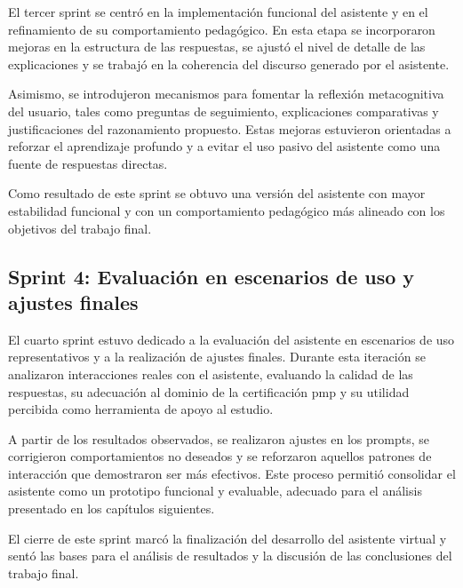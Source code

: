 El tercer sprint se centró en la implementación funcional del asistente y en el refinamiento de su comportamiento pedagógico. En esta etapa se incorporaron mejoras en la estructura de las respuestas, se ajustó el nivel de detalle de las explicaciones y se trabajó en la coherencia del discurso generado por el asistente.

Asimismo, se introdujeron mecanismos para fomentar la reflexión metacognitiva del usuario, tales como preguntas de seguimiento, explicaciones comparativas y justificaciones del razonamiento propuesto. Estas mejoras estuvieron orientadas a reforzar el aprendizaje profundo y a evitar el uso pasivo del asistente como una fuente de respuestas directas.

Como resultado de este sprint se obtuvo una versión del asistente con mayor estabilidad funcional y con un comportamiento pedagógico más alineado con los objetivos del trabajo final.

\subsection{Sprint 4: Evaluación en escenarios de uso y ajustes finales}

El cuarto sprint estuvo dedicado a la evaluación del asistente en escenarios de uso representativos y a la realización de ajustes finales. Durante esta iteración se analizaron interacciones reales con el asistente, evaluando la calidad de las respuestas, su adecuación al dominio de la certificación \gls{pmp} y su utilidad percibida como herramienta de apoyo al estudio.

A partir de los resultados observados, se realizaron ajustes en los prompts, se corrigieron comportamientos no deseados y se reforzaron aquellos patrones de interacción que demostraron ser más efectivos. Este proceso permitió consolidar el asistente como un prototipo funcional y evaluable, adecuado para el análisis presentado en los capítulos siguientes.

El cierre de este sprint marcó la finalización del desarrollo del asistente virtual y sentó las bases para el análisis de resultados y la discusión de las conclusiones del trabajo final.